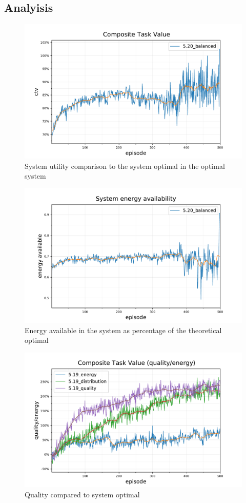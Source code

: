 \subsection{Analyisis}


\begin{figure}[ht]
	\centering
	\includegraphics[width=0.7\linewidth]{5_ctv-optimal-ctv}
	\captionsetup{labelfont=bf,singlelinecheck=on}
	\caption{System utility comparison to the system optimal in the optimal system}
	\label{fig:5_ctv-optimal-ctv}
\end{figure}
\begin{figure}[ht]
	\centering
	\includegraphics[width=0.7\linewidth]{5_ctv-statistics-energy-available}
	\captionsetup{labelfont=bf,singlelinecheck=on}
	\caption{Energy available in the system as percentage of the theoretical optimal}
	\label{fig:5_ctv-statistics-energy-available}
\end{figure}
\begin{figure}[ht]
	\centering
	\includegraphics[width=0.8\linewidth]{5.19_ctv-quality-energy}
	\captionsetup{labelfont=bf,singlelinecheck=on}
	\caption{Quality compared to system optimal}
	\label{fig:5.19_ctv-quality-energy}
\end{figure}

